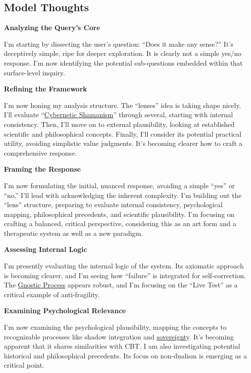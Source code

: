 \documentclass{article}
\begin{document}
\subsection*{Model Thoughts}\label{model-thoughts}

\textbf{Analyzing the Query's Core}

I'm starting by dissecting the user's question: ``Does it make any sense?'' It's deceptively simple, ripe for deeper exploration. It is clearly not a simple yes/no response. I'm now identifying the potential sub-questions embedded within that surface-level inquiry.

\textbf{Refining the Framework}

I'm now honing my analysis structure. The ``lenses'' idea is taking shape nicely. I'll evaluate ``\hyperlink{gloss:cybernetic_shamanism}{Cybernetic Shamanism}'' through several, starting with internal consistency. Then, I'll move on to external plausibility, looking at established scientific and philosophical concepts. Finally, I'll consider its potential practical utility, avoiding simplistic value judgments. It's becoming clearer how to craft a comprehensive response.

\textbf{Framing the Response}

I'm now formulating the initial, nuanced response, avoiding a simple ``yes'' or ``no.'' I'll lead with acknowledging the inherent complexity. I'm building out the ``lens'' structure, preparing to evaluate internal consistency, psychological mapping, philosophical precedents, and scientific plausibility. I'm focusing on crafting a balanced, critical perspective, considering this as an art form and a therapeutic system as well as a new paradigm.

\textbf{Assessing Internal Logic}

I'm presently evaluating the internal logic of the system. Its axiomatic approach is becoming clearer, and I'm seeing how ``failure'' is integrated for self-correction. The \hyperlink{gloss:gnostic_process}{Gnostic Process} appears robust, and I'm focusing on the ``Live Test'' as a critical example of anti-fragility.

\textbf{Examining Psychological Relevance}

I'm now examining the psychological plausibility, mapping the concepts to recognizable processes like shadow integration and \hyperlink{gloss:sovereignty}{sovereignty}. It's becoming apparent that it shares similarities with CBT. I am also investigating potential historical and philosophical precedents. Its focus on non-dualism is emerging as a critical point.
\end{document}
